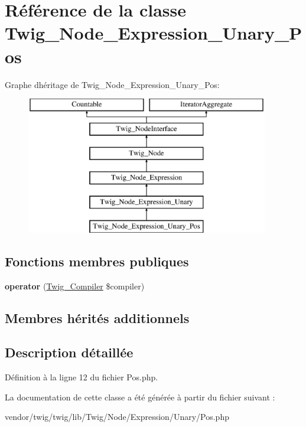 \hypertarget{class_twig___node___expression___unary___pos}{}\section{Référence de la classe Twig\+\_\+\+Node\+\_\+\+Expression\+\_\+\+Unary\+\_\+\+Pos}
\label{class_twig___node___expression___unary___pos}
Graphe d\textquotesingle{}héritage de Twig\+\_\+\+Node\+\_\+\+Expression\+\_\+\+Unary\+\_\+\+Pos\+:\begin{figure}[H]
\begin{center}
\leavevmode
\includegraphics[height=6.000000cm]{class_twig___node___expression___unary___pos}
\end{center}
\end{figure}
\subsection*{Fonctions membres publiques}
\begin{DoxyCompactItemize}
\item 
{\bfseries operator} (\hyperlink{class_twig___compiler}{Twig\+\_\+\+Compiler} \$compiler)\hypertarget{class_twig___node___expression___unary___pos_af77318ec88d5f8a508684970a150b670}{}\label{class_twig___node___expression___unary___pos_af77318ec88d5f8a508684970a150b670}

\end{DoxyCompactItemize}
\subsection*{Membres hérités additionnels}


\subsection{Description détaillée}


Définition à la ligne 12 du fichier Pos.\+php.



La documentation de cette classe a été générée à partir du fichier suivant \+:\begin{DoxyCompactItemize}
\item 
vendor/twig/twig/lib/\+Twig/\+Node/\+Expression/\+Unary/Pos.\+php\end{DoxyCompactItemize}
